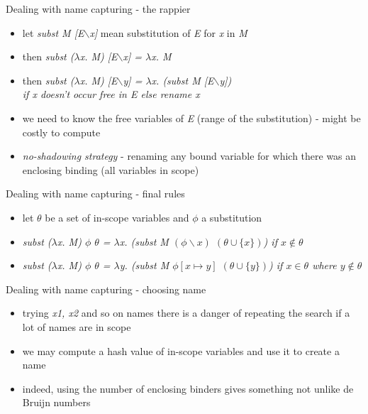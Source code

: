 \documentclass[hyperref={pdfpagelabels=false},xcolor={dvipsnames},compress,table,usenames,dvipsnames]{beamer}
\begin{document}
    \begin{frame}[fragile]{Dealing with name capturing - the rappier}
        \begin{itemize}
            \item let \textit{subst M [E$\backslash$x]} mean substitution of \textit{E} for \textit{x} in \textit{M}\pause
            \item then \textit{subst ($\lambda$x. M) [E$\backslash$x] = $\lambda$x. M}\pause
            \item then \textit{subst ($\lambda$x. M) [E$\backslash$y] = $\lambda$x. (subst M [E$\backslash$y])\\if x doesn't occur free in E else rename x}\pause
            \item we need to know the free variables of \textit{E} (range of the substitution) - might be costly to compute\pause
            \item \textit{no-shadowing strategy} - renaming any bound variable for which there was an enclosing binding (all variables in scope)
        \end{itemize}
    \end{frame}

    \begin{frame}[fragile]{Dealing with name capturing - final rules}
        \begin{itemize}
            \item let $\theta$ be a set of in-scope variables and $\phi$ a substitution\pause
            \item \textit{subst ($\lambda$x. M) $\phi$ $\theta$ = $\lambda$x. (subst M $(\phi\backslash x)$ $(\theta \cup \lbrace x \rbrace)$) if $x\not\in \theta$}\pause
            \item \textit{subst ($\lambda$x. M) $\phi$ $\theta$ = $\lambda$y. (subst M $\phi[x \mapsto y]$ $(\theta \cup \lbrace y \rbrace)$) if $x\in \theta$ where $y\not\in \theta$}
        \end{itemize}
    \end{frame}

    \begin{frame}[fragile]{Dealing with name capturing - choosing name}
        \begin{itemize}
            \item trying \textit{x1, x2} and so on names there is a danger of repeating the search if a lot of names are in scope\pause
            \item we may compute a hash value of in-scope variables and use it to create a name\pause
            \item indeed, using the number of enclosing binders gives something not unlike de Bruijn numbers
        \end{itemize}
    \end{frame}
\end{document}
